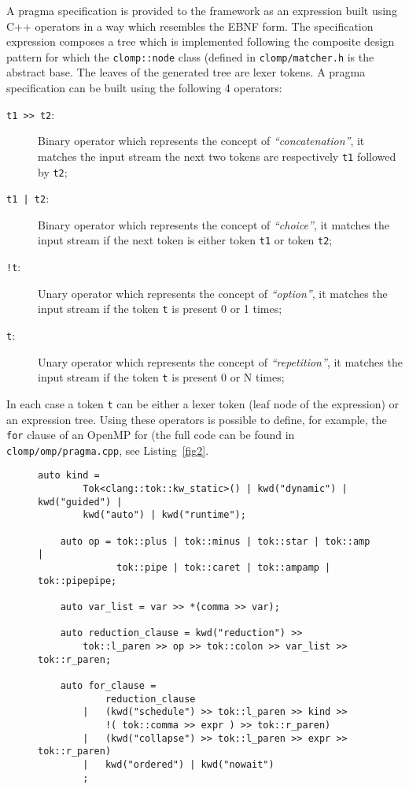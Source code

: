 \documentclass[10pt]{report}
\begin{document}
A pragma specification is provided to the framework as an expression built using
C++ operators in a way which resembles the EBNF form. The specification
expression composes a tree which is implemented following the composite design
pattern for which the {\tt clomp::node} class (defined in {\tt clomp/matcher.h}
is the abstract base. The leaves of the generated tree are lexer tokens. A
pragma specification can be built using the following 4 operators:

\begin{description}
\item [{\tt t1 >> t2}:] Binary operator which represents the concept of
\emph{``concatenation''}, it matches the input stream the next two tokens are
respectively {\tt t1} followed by {\tt t2};

\item [{\tt t1 | t2}:] Binary operator which represents the concept of
\emph{``choice''}, it matches the input stream if the next token is either token
{\tt t1} or token {\tt t2};

\item [{\tt !t}:] Unary operator which represents the concept of
\emph{``option''}, it matches the input stream if the token {\tt t} is present 0
or 1 times;

\item [{\tt *t}:] Unary operator which represents the concept of
\emph{``repetition''}, it matches the input stream if the token {\tt t} is
present 0 or N times;
\end{description}

In each case a token {\tt t} can be either a lexer token (leaf node of the
expression) or an expression tree. Using these operators is possible to define, for
example, the {\tt for} clause of an OpenMP for (the full code can be found in
{\tt clomp/omp/pragma.cpp}, see Listing~\ref{fig2}.

\begin{figure}[ht]
\begin{lstlisting}[label=fig2,caption=OpenMP for clause definition]
	auto kind =  
		Tok<clang::tok::kw_static>() | kwd("dynamic") | kwd("guided") | 
		kwd("auto") | kwd("runtime");

	auto op = tok::plus | tok::minus | tok::star | tok::amp |
			  tok::pipe | tok::caret | tok::ampamp | tok::pipepipe;

	auto var_list = var >> *(comma >> var);

	auto reduction_clause = kwd("reduction") >> 
		tok::l_paren >> op >> tok::colon >> var_list >> tok::r_paren;

	auto for_clause =	
			reduction_clause
		|	(kwd("schedule") >> tok::l_paren >> kind >> 
			!( tok::comma >> expr ) >> tok::r_paren)
		|	(kwd("collapse") >> tok::l_paren >> expr >> tok::r_paren)
		|   kwd("ordered") | kwd("nowait") 
		;
\end{lstlisting}
\end{figure}
\end{document}
